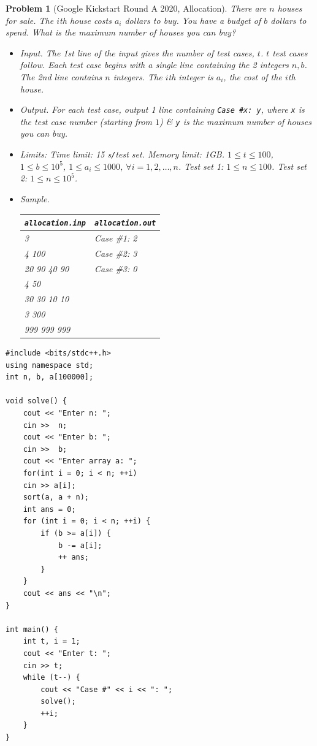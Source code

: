 \documentclass{article}
\newtheorem{problem}{Problem}
\begin{document}
\begin{problem}[Google Kickstart Round A 2020, Allocation]
	There are $n$ houses for sale. The $i$th house costs $a_i$ dollars to buy. You have a budget of $b$ dollars to spend. What is the maximum number of houses you can buy?
	\begin{itemize}
		\item {\sf Input.} The 1st line of the input gives the number of test cases, $t$. $t$ test cases follow. Each test case begins with a single line containing the 2 integers $n,b$. The 2nd line contains $n$ integers. The $i$th integer is $a_i$, the cost of the $i$th house.
		\item {\sf Output.} For each test case, output 1 line containing \verb|Case #x: y|, where \texttt{x} is the test case number (starting from $1$) \& \texttt{y} is the maximum number of houses you can buy.
		\item {\sf Limits:} Time limit: \emph{15 s\texttt{/}test set}. Memory limit: \emph{1GB}. $1\le t\le100$, $1\le b\le10^5$, $1\le a_i\le1000$, $\forall i = 1,2,\ldots,n$. Test set 1: $1\le n\le100$. Test set 2: $1\le n\le10^5$.
		\item {\sf Sample.}
		\begin{table}[H]
			\centering
			\begin{tabular}{|l|l|}
				\hline
				\texttt{allocation.inp} & \texttt{allocation.out} \\
				\hline
				3 & Case \#1: 2 \\
				4 100 & Case \#2: 3 \\
				20 90 40 90 & Case \#3: 0 \\
				4 50 & \\
				30 30 10 10 & \\
				3 300 & \\
				999 999 999 & \\
				\hline
			\end{tabular}
		\end{table}
	\end{itemize}
\end{problem}

\begin{verbatim}
#include <bits/stdc++.h>
using namespace std;
int n, b, a[100000];

void solve() {
    cout << "Enter n: ";
    cin >>  n;
    cout << "Enter b: ";
    cin >>  b;
    cout << "Enter array a: ";
    for(int i = 0; i < n; ++i)
    cin >> a[i];
    sort(a, a + n);
    int ans = 0;
    for (int i = 0; i < n; ++i) {
        if (b >= a[i]) {
            b -= a[i];
            ++ ans;
        }
    }
    cout << ans << "\n";
}

int main() {
    int t, i = 1;
    cout << "Enter t: ";
    cin >> t;
    while (t--) {
        cout << "Case #" << i << ": ";
        solve();
        ++i;
    }
}
\end{verbatim}
\end{document}
